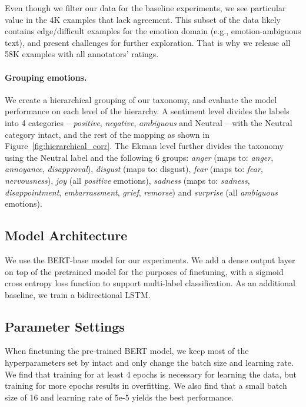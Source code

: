 \documentclass[11pt,a4paper]{article}
\begin{document}
Even though we filter our data for the baseline experiments, we see particular value in the 4K examples that lack agreement. This subset of the data likely contains edge/difficult examples for the emotion domain (e.g., emotion-ambiguous text), and present challenges for further exploration. That is why we release all 58K examples with all annotators' ratings.


\paragraph{Grouping emotions.} We create a hierarchical grouping of our taxonomy, and evaluate the model performance on each level of the hierarchy. A sentiment level divides the labels into 4 categories -- \emph{positive}, \emph{negative}, \emph{ambiguous} and Neutral -- with the Neutral category intact, and the rest of the mapping as shown in Figure~\ref{fig:hierarchical_corr}. The Ekman level further divides the taxonomy using the Neutral label and the following 6 groups: \emph{anger} (maps to: \emph{anger}, \emph{annoyance}, \emph{disapproval}), \emph{disgust} (maps to: disgust), \emph{fear} (maps to: \emph{fear}, \emph{nervousness}), \emph{joy} (all \emph{positive} emotions), \emph{sadness} (maps to: \emph{sadness}, \emph{disappointment}, \emph{embarrassment}, \emph{grief}, \emph{remorse}) and \emph{surprise} (all \emph{ambiguous} emotions).




\subsection{Model Architecture}

We use the BERT-base model \cite{devlin2019bert} for our experiments. We add a dense output layer on top of the pretrained model for the purposes of finetuning, with a sigmoid cross entropy loss function to support multi-label classification. As an additional baseline, we train a bidirectional LSTM.

\subsection{Parameter Settings}

When finetuning the pre-trained BERT model, we keep most of the hyperparameters set by \citet{devlin2019bert} intact and only change the batch size and learning rate. We find that training for at least 4 epochs is necessary for learning the data, but training for more epochs results in overfitting. We also find that a small batch size of 16 and learning rate of 5e-5 yields the best performance.
\end{document}
